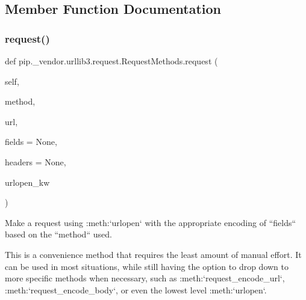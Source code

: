 \subsection{Member Function Documentation}
\mbox{\label{classpip_1_1__vendor_1_1urllib3_1_1request_1_1RequestMethods_a9afc17c24efbf4815f747738db7ae064}} 
\subsubsection{\texorpdfstring{request()}{request()}}
{\footnotesize\ttfamily def pip.\+\_\+vendor.\+urllib3.\+request.\+Request\+Methods.\+request (\begin{DoxyParamCaption}\item[{}]{self,  }\item[{}]{method,  }\item[{}]{url,  }\item[{}]{fields = {\ttfamily None},  }\item[{}]{headers = {\ttfamily None},  }\item[{}]{urlopen\+\_\+kw }\end{DoxyParamCaption})}

\begin{DoxyVerb}Make a request using :meth:`urlopen` with the appropriate encoding of
``fields`` based on the ``method`` used.

This is a convenience method that requires the least amount of manual
effort. It can be used in most situations, while still having the
option to drop down to more specific methods when necessary, such as
:meth:`request_encode_url`, :meth:`request_encode_body`,
or even the lowest level :meth:`urlopen`.
\end{DoxyVerb}
 \mbox{\label{classpip_1_1__vendor_1_1urllib3_1_1request_1_1RequestMethods_a64ca2c54fdf3e2e203ebfb7ba775afea}} 
